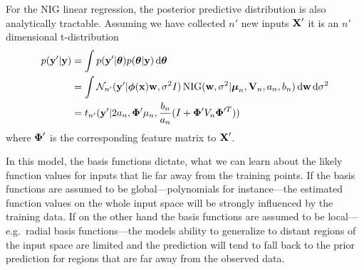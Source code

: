 \documentclass[../thesis.tex]{subfiles}
\begin{document}
For the NIG linear regression, the posterior predictive distribution is also analytically tractable. Assuming we have collected $n'$ new inputs $\boldsymbol{\mathbf{X}}'$ it is an $n'$ dimensional t-distribution
\begin{equation}
    \begin{split}
        p(\boldsymbol{\mathbf{y}}' | \boldsymbol{\mathbf{y}}) &= \int p(\boldsymbol{\mathbf{y}}' | \boldsymbol{\mathbf{\theta}}) p(\boldsymbol{\mathbf{\theta}} | \boldsymbol{\mathbf{y}}) \mathop{}\!\mathrm{d}\boldsymbol{\mathbf{\theta}} \\
        &=  \int \mathcal{N}_{n'} (\boldsymbol{\mathbf{y}}' | \boldsymbol{\mathbf{\phi}}(\boldsymbol{\mathbf{x}}) \boldsymbol{\mathbf{w}}, \sigma^2 I)  \operatorname{NIG}(\boldsymbol{\mathbf{w}}, \sigma^2 | \boldsymbol{\mathbf{\mu}}_n, \boldsymbol{\mathbf{V}}_n, a_n, b_n) \mathop{}\!\mathrm{d} \boldsymbol{\mathbf{w}} \mathop{}\!\mathrm{d}\sigma^2 \\
        &=  t_{n'}(\boldsymbol{\mathbf{y}}' | 2a_n, \boldsymbol{\mathbf{\Phi}}' \mu_n, \frac{b_n}{a_n} (I + \boldsymbol{\mathbf{\Phi}}' V_n \boldsymbol{\mathbf{\Phi}}^{\prime T}))
    \end{split}
\end{equation}
where $\boldsymbol{\mathbf{\Phi}}'$ is the corresponding feature matrix to $\boldsymbol{\mathbf{X}}'$. 

In this model, the basis functions dictate, what we can learn about the likely function values for inputs that lie far away from the training points. If the basis functions are assumed to be global---polynomials for instance---the estimated function values on the whole input space will be strongly influenced by the training data. If on the other hand the basis functions are assumed to be local---e.g.\ radial basis functions---the models ability to generalize to distant regions of the input space are limited and the prediction will tend to fall back to the prior prediction for regions that are far away from the observed data.
\end{document}
